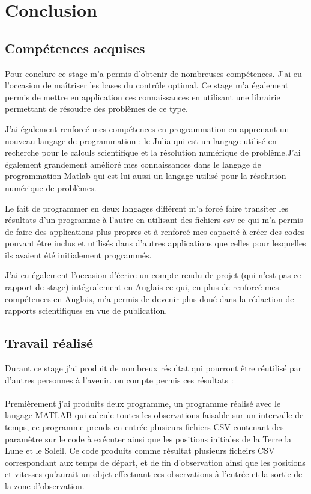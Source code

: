 \documentclass[12pt]{article} %
\begin{document}
		\newpage
		\section{Conclusion}
		\subsection{Compétences acquises}
		Pour conclure ce stage m'a permis d'obtenir de nombreuses compétences.
		 J'ai eu l'occasion de maîtriser les bases du contrôle optimal. Ce stage m'a également permis de mettre en application ces connaissances en utilisant une librairie permettant de résoudre des problèmes de ce type.
		
		J'ai également renforcé mes compétences en programmation en apprenant un nouveau langage de programmation : le Julia qui est un langage utilisé en recherche pour le calculs scientifique et la résolution numérique de problème.J'ai également grandement amélioré mes connaissances dans le langage de programmation Matlab qui est lui aussi un langage utilisé pour la résolution numérique de problèmes.
		
		Le fait de programmer en deux langages différent m'a forcé faire transiter les résultats d'un programme à l'autre en utilisant des fichiers csv ce qui m'a permis de faire des applications plus propres et à renforcé mes capacité à créer des codes pouvant être inclus et utilisés dans d'autres applications que celles pour lesquelles ils avaient été initialement programmés.
		
		J'ai eu également l'occasion d'écrire un compte-rendu de projet (qui n'est pas ce rapport de stage) intégralement en Anglais ce qui, en plus de renforcé mes compétences en Anglais, m'a permis de devenir plus doué dans la rédaction de rapports scientifiques en vue de publication.
		
		\subsection{Travail réalisé}
		
		Durant ce stage j'ai produit de nombreux résultat qui pourront être réutilisé par d'autres personnes à l'avenir. on compte permis ces résultats : 
		\\ \\
		Premièrement j'ai produits deux programme, un programme réalisé avec le langage MATLAB qui calcule toutes les observations faisable sur un intervalle de temps, ce programme prends en entrée plusieurs fichiers CSV contenant des paramètre sur le code à exécuter ainsi que les positions initiales de la Terre la Lune et le Soleil. Ce code produits comme résultat plusieurs ficheirs CSV correspondant aux temps de départ, et de fin d'observation ainsi que les positions et vitesses qu'aurait un objet effectuant ces observations à l'entrée et la sortie de la zone d'observation.
		
\end{document}
